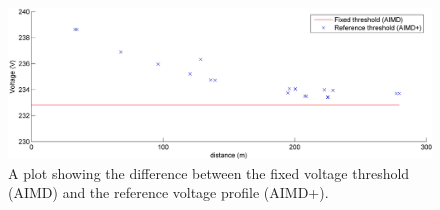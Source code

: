 \begin{figure}\centering
	\includegraphics{_chapter4/fig/ref-voltage-difference}
	\caption{A plot showing the difference between the fixed voltage threshold (AIMD) and the reference voltage profile (AIMD+).}
	\label{ch4:fig:ref-voltage-difference}
\end{figure}